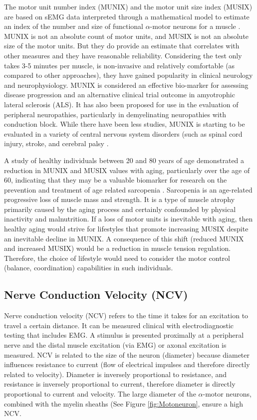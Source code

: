 The motor unit number index (MUNIX) and the motor unit size index (MUSIX) are based on sEMG data interpreted through a mathematical model to estimate an index of the number and size of functional $\alpha$-motor neurons for a muscle \cite{nandedkar_motor_2004}. MUNIX is not an absolute count of motor units, and MUSIX is not an absolute size of the motor units. But they do provide an estimate that correlates with other measures and they have reasonable reliability. Considering the test only takes 3-5 minutes per muscle, is non-invasive and relatively comfortable (as compared to other approaches), they have gained popularity in clinical neurology and neurophysiology. MUNIX is considered an effective bio-marker for assessing disease progression and an alternative clinical trial outcome in amyotrophic lateral sclerosis (ALS). It has also been proposed for use in the evaluation of peripheral neuropathies, particularly in demyelinating neuropathies with conduction block. While there have been less studies, MUNIX is starting to be evaluated in a variety of central nervous system disorders (such as spinal cord injury, stroke, and cerebral palsy \cite{fatehi_utility_2018}. 

A study of healthy individuals between 20 and 80 years of age demonstrated a reduction in MUNIX and MUSIX values with aging, particularly over the age of 60, indicating that they may be a valuable biomarker for research on the prevention and treatment of age related sarcopenia \cite{cao_reference_2020}. Sarcopenia is an age-related progressive loss of muscle mass and strength. It is a type of muscle atrophy primarily caused by the aging process and certainly confounded by physical inactivity and malnutrition. If a loss of motor units is inevitable with aging, then healthy aging would strive for lifestyles that promote increasing MUSIX despite an inevitable decline in MUNIX. A consequence of this shift (reduced MUNIX and increased MUSIX) would be a reduction in muscle tension regulation. Therefore, the choice of lifestyle would need to consider the motor control (balance, coordination) capabilities in such individuals.

\subsection{Nerve Conduction Velocity (NCV)}

Nerve conduction velocity (NCV) refers to the time it takes for an excitation to travel a certain distance. It can be measured clinical with electrodiagnostic testing that includes EMG. A stimulus is presented proximally at a peripheral nerve and the distal muscle excitation (via EMG) or axonal excitation is measured. NCV is related to the size of the neuron (diameter) because diameter influences resistance to current (flow of electrical impulses and therefore directly related to velocity). Diameter is inversely proportional to resistance, and resistance is inversely proportional to current, therefore diameter is directly proportional to current and velocity. The large diameter of the $\alpha$-motor neurons, combined with the myelin sheaths (See Figure \ref{fig:Motoneuron}, ensure a high NCV. 


